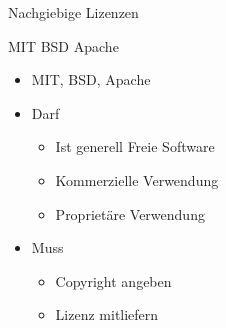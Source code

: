 \begin{frame}{Nachgiebige Lizenzen}
	\begin{center}
		{\Huge MIT}
		\hfill
		{\Huge BSD}
		\hfill
		{\Huge Apache}
	\end{center}
\end{frame}
\note
{
	\begin{itemize}
		\item MIT, BSD, Apache
		\item Darf
		\begin{itemize}
			\item Ist generell Freie Software
			\item Kommerzielle Verwendung
			\item Proprietäre Verwendung
		\end{itemize}
		\item Muss
		\begin{itemize}
			\item Copyright angeben
			\item Lizenz mitliefern
		\end{itemize}
	\end{itemize}
}

